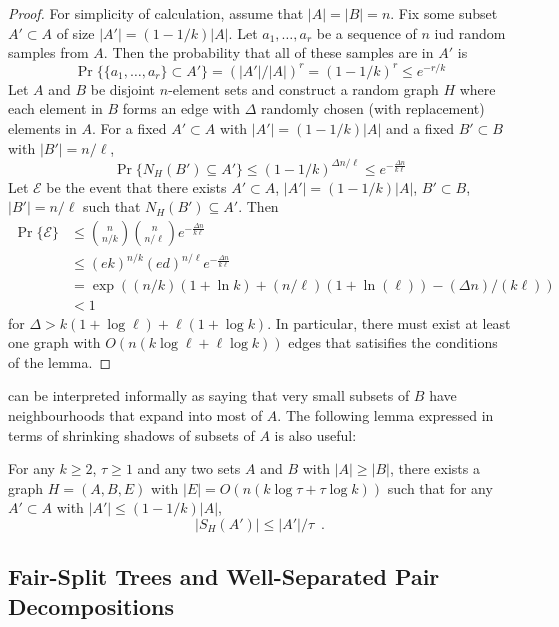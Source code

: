 \documentclass{patmorin}
\begin{document}
\begin{proof}
  For simplicity of calculation, assume that $|A|=|B|=n$.  Fix some
  subset $A'\subset A$ of size $|A'|=(1-1/k)|A|$.  Let $a_1,\ldots,a_r$
  be a sequence of $n$ iud random samples from $A$.  Then the probability
  that all of these samples are in $A'$ is
  \[
     \Pr\{\{a_1,\ldots,a_r\}\subset A'\} = (|A'|/|A|)^r = (1-1/k)^r \le e^{-r/k}
  \]
  Let $A$ and $B$ be disjoint $n$-element sets and construct a random
  graph $H$ where each element in $B$ forms an edge with $\Delta$ randomly
  chosen (with replacement) elements in $A$.  For a fixed $A'\subset A$
  with $|A'|=(1-1/k)|A|$ and a fixed $B'\subset B$ with $|B'| = n/\ell$,
  \[
    \Pr\{N_H(B') \subseteq A'\} 
        \le (1-1/k)^{\Delta n/\ell} 
        \le e^{-\frac{\Delta n}{k\ell}}
  \]
  Let $\mathcal{E}$ be the event that there exists $A'\subset A$, $|A'|=(1-1/k)|A|$, $B'\subset B$, $|B'|=n/\ell$ such that $N_H(B')\subseteq A'$.  Then
  \begin{align*}
    \Pr\{\mathcal{E}\} 
        & \le \binom{n}{n/k}\binom{n}{n/\ell}e^{-\frac{\Delta n}{k\ell}} \\
        & \le (ek)^{n/k} (ed)^{n/\ell}e^{-\frac{\Delta n}{k\ell}} \\
        & = \exp((n/k)(1+\ln k) + (n/\ell)(1+\ln(\ell)) - (\Delta n)/(k\ell)) \\
        & < 1
  \end{align*}
  for $\Delta > k(1+\log \ell) + \ell(1+\log k)$.  In particular, there
  must exist at least one graph with $O(n(k\log\ell + \ell\log k))$
  edges that satisifies the conditions of the lemma.
\end{proof}

 can be interpreted informally as saying that very
small subsets of $B$ have neighbourhoods that expand into most of $A$.  
The following lemma expressed in terms
of shrinking shadows of subsets of $A$ is also useful:

\begin{cor}
   For any $k\ge 2$, $\tau\ge 1$ and any two sets $A$ and $B$ with $|A|\ge|B|$,
   there exists a graph $H=(A,B,E)$
   with $|E|=O(n(k\log \tau + \tau\log k))$ such that
   for any $A'\subset A$ with $|A'|\le (1-1/k)|A|$, 
   \[ |S_H(A')| \le |A'|/\tau \enspace .\]
\end{cor}




\subsection{Fair-Split Trees and Well-Separated Pair Decompositions}
\end{document}
